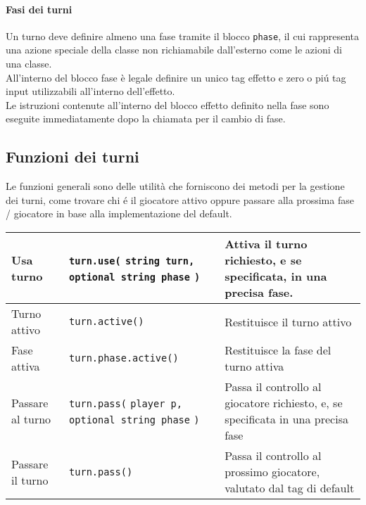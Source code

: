 \paragraph*{Fasi dei turni}
Un turno deve definire almeno una fase tramite il blocco \lstinline|phase|, il cui rappresenta 
una azione speciale della classe non richiamabile dall'esterno come le azioni di una classe. \\
All'interno del blocco fase è legale definire un unico tag effetto e zero o piú tag input utilizzabili 
all'interno dell'effetto. \\ 
Le istruzioni contenute all'interno del blocco effetto definito nella fase sono eseguite immediatamente
dopo la chiamata per il cambio di fase.

\subsection{Funzioni dei turni}
Le funzioni generali sono delle utilità che forniscono dei metodi per la gestione
dei turni, come trovare chi é il giocatore attivo oppure passare alla prossima 
fase / giocatore in base alla implementazione del default. \\

\begin{center}
\begin{tabularx}{\linewidth}{|l|p{6cm}|X|}
    \hline
    Usa turno & 
    \lstinline|turn.use(|\newline 
    \lstinline|string turn, |\newline
    \lstinline|optional string phase|\newline
    \lstinline|)| & Attiva il turno richiesto, e se specificata, in una precisa fase.\\
    \hline 
    Turno attivo & \lstinline|turn.active()| & Restituisce il turno attivo \\
    \hline
    Fase attiva & \lstinline|turn.phase.active()| & Restituisce la fase del turno attiva \\
    \hline
    Passare al turno &
    \lstinline|turn.pass(|\newline
    \lstinline|player p, |\newline
    \lstinline|optional string phase|\newline
    \lstinline|)|
    &
    Passa il controllo al giocatore richiesto,
    e, se specificata in una precisa fase \\
    \hline
    Passare il turno & \lstinline|turn.pass()| & Passa il controllo al prossimo giocatore, 
    valutato dal tag di default \\
    \hline 
\end{tabularx}
\end{center}

